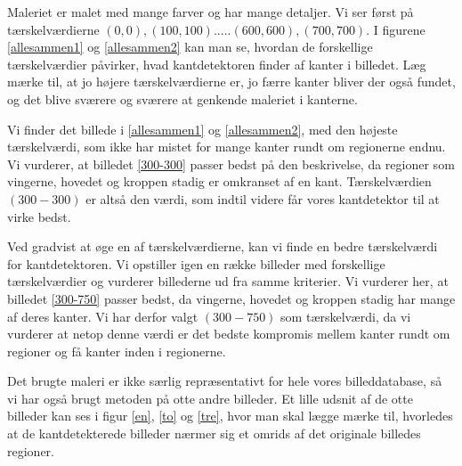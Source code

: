 Maleriet er malet med mange farver og har mange detaljer. Vi ser først
på tærskelværdierne $(0,0),(100,100).....(600,600),(700,700)$. I
figurene \ref{allesammen1} og \ref{allesammen2} kan man se, hvordan de
forskellige tærskelværdier påvirker, hvad kantdetektoren finder af kanter i
billedet. Læg mærke til, at jo højere tærskelværdierne er, jo færre kanter
bliver der også fundet, og det blive sværere og sværere at genkende maleriet i kanterne. 

Vi finder det billede i \ref{allesammen1} og \ref{allesammen2}, med
den højeste tærskelværdi, som ikke har mistet for mange kanter rundt om
regionerne endnu. Vi vurderer, at billedet \ref{300-300} passer bedst på
den beskrivelse, da regioner som vingerne, hovedet og kroppen stadig er
omkranset af en kant. Tærskelværdien $(300-300)$ er altså den værdi, som indtil videre får
vores kantdetektor til at virke bedst.

Ved gradvist at øge en af tærskelværdierne, kan vi finde en
bedre tærskelværdi for kantdetektoren. Vi opstiller igen en række
billeder med forskellige tærskelværdier og vurderer billederne ud fra
samme kriterier. Vi vurderer her, at billedet \ref{300-750} passer bedst,
da vingerne, hovedet og kroppen stadig har mange af deres kanter. Vi har
derfor valgt $(300-750)$ som tærskelværdi, da vi vurderer at netop denne
værdi er det bedste kompromis mellem kanter rundt om regioner og få
kanter inden i regionerne.

Det brugte maleri er ikke særlig repræsentativt for hele vores
billeddatabase, så vi har også brugt metoden på otte andre billeder. Et
lille udsnit af de otte billeder kan ses i figur \ref{en}, \ref{to} og
\ref{tre}, hvor man skal lægge mærke til, hvorledes at de
kantdetekterede billeder nærmer sig et omrids af det originale billedes
regioner.


